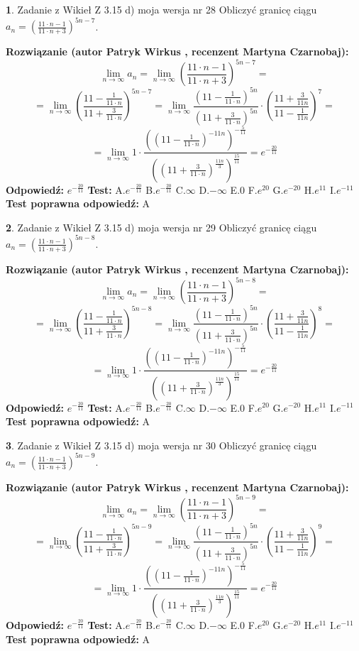 \documentclass[12pt, a4paper]{article}
\theoremstyle{definition} %
\newtheorem{zad}{}
\newcommand{\zadStart}[1]{\begin{zad}#1\newline}
\newcommand{\zadStop}{\end{zad}}
\newcommand{\rozwStart}[2]{\noindent \textbf{Rozwiązanie (autor #1 , recenzent #2): }\newline}
\newcommand{\rozwStop}{\newline}
\newcommand{\odpStart}{\noindent \textbf{Odpowiedź:}\newline}
\newcommand{\odpStop}{\newline}
\newcommand{\testStart}{\noindent \textbf{Test:}\newline}
\newcommand{\testStop}{\newline}
\newcommand{\kluczStart}{\noindent \textbf{Test poprawna odpowiedź:}\newline}
\newcommand{\kluczStop}{\newline}
\begin{document}
\zadStart{Zadanie z Wikieł Z 3.15 d) moja wersja nr 28}
Obliczyć granicę ciągu $a_{n}=(\frac{11\cdot n - 1}{11 \cdot n + 3})^{5n-7}$.
\zadStop
\rozwStart{Patryk Wirkus}{Martyna Czarnobaj}
$$\lim\limits_{n\to\infty} a_{n} = \lim\limits_{n\to\infty}(\frac{11\cdot n - 1}{11 \cdot n + 3})^{5n-7}=$$
$$=\lim\limits_{n\to\infty}(\frac{11 - \frac{1}{11\cdot n}}{11 + \frac{3}{11 \cdot n}})^{5n-7}=\lim\limits_{n\to\infty}\frac{(11 - \frac{1}{11\cdot n})^{5n}}{(11 + \frac{3}{11\cdot n})^{5n}} \cdot (\frac{11+\frac{3}{11n}}{11-\frac{1}{11n}})^{7}=$$
$$=\lim\limits_{n\to\infty} 1 \cdot \frac{((11-\frac{1}{11 \cdot n})^{-11n})^{-\frac{5}{11}}}{((11+\frac{3}{11 \cdot n})^{\frac{11n}{3}})^{\frac{15}{11}}} =e^{-\frac{20}{11}}$$
\rozwStop
\odpStart
$e^{-\frac{20}{11}}$
\odpStop
\testStart
A.$ e^{-\frac{20}{11}}$
B.$ e^{-\frac{20}{11}}$
C.$\infty$
D.$-\infty$
E.$0$
F.$e^{20}$
G.$e^{-20}$
H.$e^{11}$
I.$e^{-11}$
\testStop
\kluczStart
A
\kluczStop



\zadStart{Zadanie z Wikieł Z 3.15 d) moja wersja nr 29}
Obliczyć granicę ciągu $a_{n}=(\frac{11\cdot n - 1}{11 \cdot n + 3})^{5n-8}$.
\zadStop
\rozwStart{Patryk Wirkus}{Martyna Czarnobaj}
$$\lim\limits_{n\to\infty} a_{n} = \lim\limits_{n\to\infty}(\frac{11\cdot n - 1}{11 \cdot n + 3})^{5n-8}=$$
$$=\lim\limits_{n\to\infty}(\frac{11 - \frac{1}{11\cdot n}}{11 + \frac{3}{11 \cdot n}})^{5n-8}=\lim\limits_{n\to\infty}\frac{(11 - \frac{1}{11\cdot n})^{5n}}{(11 + \frac{3}{11\cdot n})^{5n}} \cdot (\frac{11+\frac{3}{11n}}{11-\frac{1}{11n}})^{8}=$$
$$=\lim\limits_{n\to\infty} 1 \cdot \frac{((11-\frac{1}{11 \cdot n})^{-11n})^{-\frac{5}{11}}}{((11+\frac{3}{11 \cdot n})^{\frac{11n}{3}})^{\frac{15}{11}}} =e^{-\frac{20}{11}}$$
\rozwStop
\odpStart
$e^{-\frac{20}{11}}$
\odpStop
\testStart
A.$ e^{-\frac{20}{11}}$
B.$ e^{-\frac{20}{11}}$
C.$\infty$
D.$-\infty$
E.$0$
F.$e^{20}$
G.$e^{-20}$
H.$e^{11}$
I.$e^{-11}$
\testStop
\kluczStart
A
\kluczStop



\zadStart{Zadanie z Wikieł Z 3.15 d) moja wersja nr 30}
Obliczyć granicę ciągu $a_{n}=(\frac{11\cdot n - 1}{11 \cdot n + 3})^{5n-9}$.
\zadStop
\rozwStart{Patryk Wirkus}{Martyna Czarnobaj}
$$\lim\limits_{n\to\infty} a_{n} = \lim\limits_{n\to\infty}(\frac{11\cdot n - 1}{11 \cdot n + 3})^{5n-9}=$$
$$=\lim\limits_{n\to\infty}(\frac{11 - \frac{1}{11\cdot n}}{11 + \frac{3}{11 \cdot n}})^{5n-9}=\lim\limits_{n\to\infty}\frac{(11 - \frac{1}{11\cdot n})^{5n}}{(11 + \frac{3}{11\cdot n})^{5n}} \cdot (\frac{11+\frac{3}{11n}}{11-\frac{1}{11n}})^{9}=$$
$$=\lim\limits_{n\to\infty} 1 \cdot \frac{((11-\frac{1}{11 \cdot n})^{-11n})^{-\frac{5}{11}}}{((11+\frac{3}{11 \cdot n})^{\frac{11n}{3}})^{\frac{15}{11}}} =e^{-\frac{20}{11}}$$
\rozwStop
\odpStart
$e^{-\frac{20}{11}}$
\odpStop
\testStart
A.$ e^{-\frac{20}{11}}$
B.$ e^{-\frac{20}{11}}$
C.$\infty$
D.$-\infty$
E.$0$
F.$e^{20}$
G.$e^{-20}$
H.$e^{11}$
I.$e^{-11}$
\testStop
\kluczStart
A
\kluczStop
\end{document}
